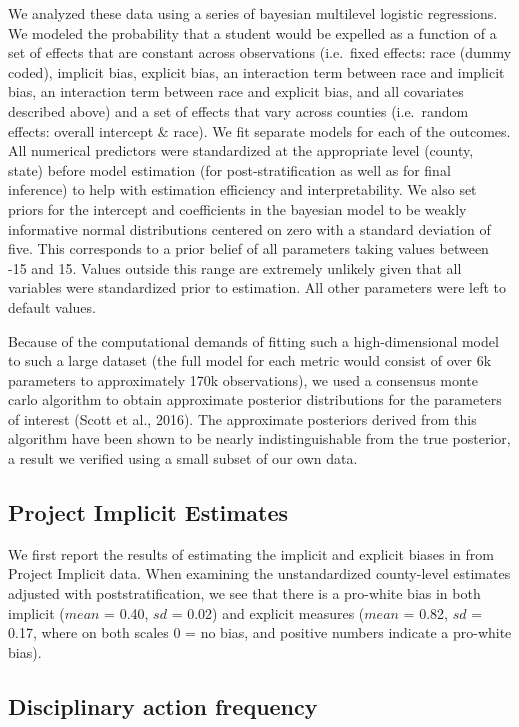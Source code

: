 \documentclass[english,floatsintext,man]{apa6}
\theoremstyle{definition}
\theoremstyle{definition}
\theoremstyle{remark}
\begin{document}
We analyzed these data using a series of bayesian multilevel logistic
regressions. We modeled the probability that a student would be expelled
as a function of a set of effects that are constant across observations
(i.e.~fixed effects: race (dummy coded), implicit bias, explicit bias,
an interaction term between race and implicit bias, an interaction term
between race and explicit bias, and all covariates described above) and
a set of effects that vary across counties (i.e.~random effects: overall
intercept \& race). We fit separate models for each of the outcomes. All
numerical predictors were standardized at the appropriate level (county,
state) before model estimation (for post-stratification as well as for
final inference) to help with estimation efficiency and
interpretability. We also set priors for the intercept and coefficients
in the bayesian model to be weakly informative normal distributions
centered on zero with a standard deviation of five. This corresponds to
a prior belief of all parameters taking values between -15 and 15.
Values outside this range are extremely unlikely given that all
variables were standardized prior to estimation. All other parameters
were left to default values.

Because of the computational demands of fitting such a high-dimensional
model to such a large dataset (the full model for each metric would
consist of over 6k parameters to approximately 170k observations), we
used a consensus monte carlo algorithm to obtain approximate posterior
distributions for the parameters of interest (Scott et al., 2016). The
approximate posteriors derived from this algorithm have been shown to be
nearly indistinguishable from the true posterior, a result we verified
using a small subset of our own data.

\subsection{Project Implicit
Estimates}\label{project-implicit-estimates}

We first report the results of estimating the implicit and explicit
biases in from Project Implicit data. When examining the unstandardized
county-level estimates adjusted with poststratification, we see that
there is a pro-white bias in both implicit (\(mean\) = 0.40, \(sd\) =
0.02) and explicit measures (\(mean\) = 0.82, \(sd\) = 0.17, where on
both scales 0 = no bias, and positive numbers indicate a pro-white
bias).

\subsection{Disciplinary action
frequency}\label{disciplinary-action-frequency}
\end{document}
